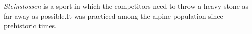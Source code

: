 \emph{Steinstossen} is a sport in which the competitors need to throw a heavy
stone as far away as possible.It was practiced among the alpine population since prehistoric times.
